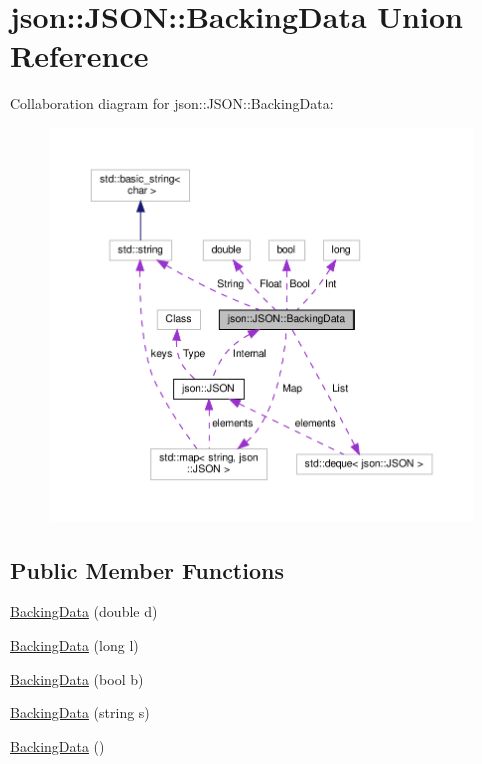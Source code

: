 \hypertarget{unionjson_1_1_j_s_o_n_1_1_backing_data}{}\section{json\+:\+:J\+S\+ON\+:\+:Backing\+Data Union Reference}
\label{unionjson_1_1_j_s_o_n_1_1_backing_data}


Collaboration diagram for json\+:\+:J\+S\+ON\+:\+:Backing\+Data\+:
\nopagebreak
\begin{figure}[H]
\begin{center}
\leavevmode
\includegraphics[width=350pt]{unionjson_1_1_j_s_o_n_1_1_backing_data__coll__graph}
\end{center}
\end{figure}
\subsection*{Public Member Functions}
\begin{DoxyCompactItemize}
\item 
\mbox{\hyperlink{unionjson_1_1_j_s_o_n_1_1_backing_data_a7d9921b5b250d942ceb1b2e11a8b9b8b}{Backing\+Data}} (double d)
\item 
\mbox{\hyperlink{unionjson_1_1_j_s_o_n_1_1_backing_data_a25277bc3224f9a7ed291fe209b9294d2}{Backing\+Data}} (long l)
\item 
\mbox{\hyperlink{unionjson_1_1_j_s_o_n_1_1_backing_data_abe54395f8ce5d9918ff0704a4e1bae98}{Backing\+Data}} (bool b)
\item 
\mbox{\hyperlink{unionjson_1_1_j_s_o_n_1_1_backing_data_a05c304ee380de872456ce7679c48b2ce}{Backing\+Data}} (string s)
\item 
\mbox{\hyperlink{unionjson_1_1_j_s_o_n_1_1_backing_data_aeeb02720b7de2606b868f6a2d11c83ea}{Backing\+Data}} ()
\end{DoxyCompactItemize}
